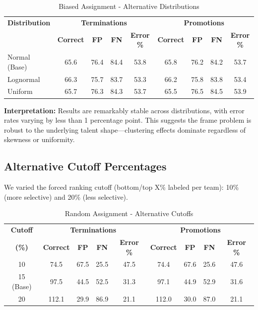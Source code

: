 \documentclass[12pt]{article}
\begin{document}
\begin{table}[h]
\centering
\caption{Biased Assignment - Alternative Distributions}
\label{tab:sens-dist-biased}
\small
\begin{tabular}{lcccccccc}
\toprule
\textbf{Distribution} & \multicolumn{4}{c}{\textbf{Terminations}} & \multicolumn{4}{c}{\textbf{Promotions}} \\
 & \textbf{Correct} & \textbf{FP} & \textbf{FN} & \textbf{Error \%} & \textbf{Correct} & \textbf{FP} & \textbf{FN} & \textbf{Error \%} \\
\midrule
Normal (Base) & 65.6 & 76.4 & 84.4 & 53.8 & 65.8 & 76.2 & 84.2 & 53.7 \\
Lognormal & 66.3 & 75.7 & 83.7 & 53.3 & 66.2 & 75.8 & 83.8 & 53.4 \\
Uniform & 65.7 & 76.3 & 84.3 & 53.7 & 65.5 & 76.5 & 84.5 & 53.9 \\
\bottomrule
\end{tabular}
\end{table}

\textbf{Interpretation:} Results are remarkably stable across distributions, with error rates varying by less than 1 percentage point. This suggests the frame problem is robust to the underlying talent shape---clustering effects dominate regardless of skewness or uniformity.

\subsection{Alternative Cutoff Percentages}

We varied the forced ranking cutoff (bottom/top X\% labeled per team): 10\% (more selective) and 20\% (less selective).

\begin{table}[h]
\centering
\caption{Random Assignment - Alternative Cutoffs}
\label{tab:sens-cutoff-random}
\small
\begin{tabular}{ccccccccc}
\toprule
\textbf{Cutoff} & \multicolumn{4}{c}{\textbf{Terminations}} & \multicolumn{4}{c}{\textbf{Promotions}} \\
\textbf{(\%)} & \textbf{Correct} & \textbf{FP} & \textbf{FN} & \textbf{Error \%} & \textbf{Correct} & \textbf{FP} & \textbf{FN} & \textbf{Error \%} \\
\midrule
10 & 74.5 & 67.5 & 25.5 & 47.5 & 74.4 & 67.6 & 25.6 & 47.6 \\
15 (Base) & 97.5 & 44.5 & 52.5 & 31.3 & 97.1 & 44.9 & 52.9 & 31.6 \\
20 & 112.1 & 29.9 & 86.9 & 21.1 & 112.0 & 30.0 & 87.0 & 21.1 \\
\bottomrule
\end{tabular}
\end{table}
\end{document}
